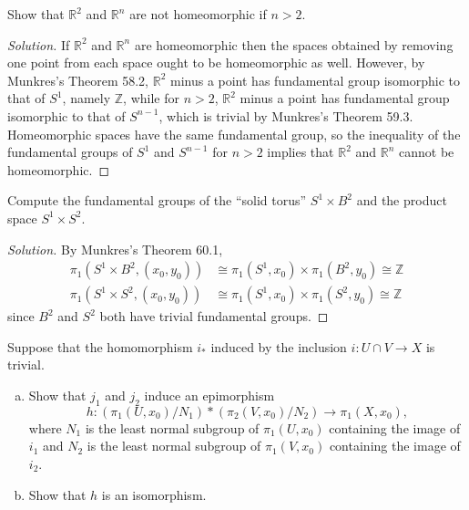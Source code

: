 \documentclass[10pt]{article}
\providecommand{\RR}{\mathbb R}
\providecommand{\ZZ}{\mathbb Z}
\providecommand{\ii}{\item}
\newenvironment{soln}{\begin{proof}[Solution]}{\end{proof}}
\begin{document}
\pagebreak
\begin{problem}
    [Munkres 59.3b]
    Show that $\RR^2$ and $\RR^n$ are not homeomorphic if $n > 2$.
\end{problem}

\begin{soln}
    If $\RR^2$ and $\RR^n$ are homeomorphic
    then the spaces obtained by removing one point from each space
    ought to be homeomorphic as well.
    However, by Munkres's Theorem 58.2,
    $\RR^2$ minus a point has fundamental group isomorphic to that of $S^1$,
    namely $\ZZ$, while for $n>2$, $\RR^2$ minus a point has fundamental group
    isomorphic to that of $S^{n-1}$, which is trivial by Munkres's Theorem 59.3.
    Homeomorphic spaces have the same fundamental group,
    so the inequality of the fundamental groups of $S^1$ and $S^{n-1}$ for $n>2$
    implies that $\RR^2$ and $\RR^n$ cannot be homeomorphic.
\end{soln}

\begin{problem}
    [Munkres 60.1]
    Compute the fundamental groups of the ``solid torus'' $S^1\times B^2$
    and the product space $S^1\times S^2$.
\end{problem}

\begin{soln}
    By Munkres's Theorem 60.1,
    \begin{align*}
        \pi_1(S^1\times B^2, (x_0,y_0)) &\cong
	\pi_1(S^1,x_0)\times\pi_1(B^2,y_0)\cong \ZZ\\
	\pi_1(S^1\times S^2, (x_0,y_0)) &\cong
	\pi_1(S^1,x_0)\times\pi_1(S^2,y_0)\cong \ZZ
    \end{align*}
    since $B^2$ and $S^2$ both have trivial fundamental groups.
\end{soln}

\begin{problem}
    [Munkres 70.1]
    Suppose that the homomorphism $i_*$ induced by the inclusion
    $i\colon U\cap V\to X$ is trivial.
    \begin{enumerate}[(a)]
        \ii Show that $j_1$ and $j_2$ induce an epimorphism
	\begin{equation*}
	    h\colon(\pi_1(U,x_0)/N_1)*(\pi_2(V,x_0)/N_2)\to \pi_1(X,x_0),
	\end{equation*}
	where $N_1$ is the least normal subgroup of $\pi_1(U,x_0)$
	containing the image of $i_1$ and
	$N_2$ is the least normal subgroup of $\pi_1(V,x_0)$
	containing the image of $i_2$.
	\ii Show that $h$ is an isomorphism.
    \end{enumerate}
\end{problem}
\end{document}
